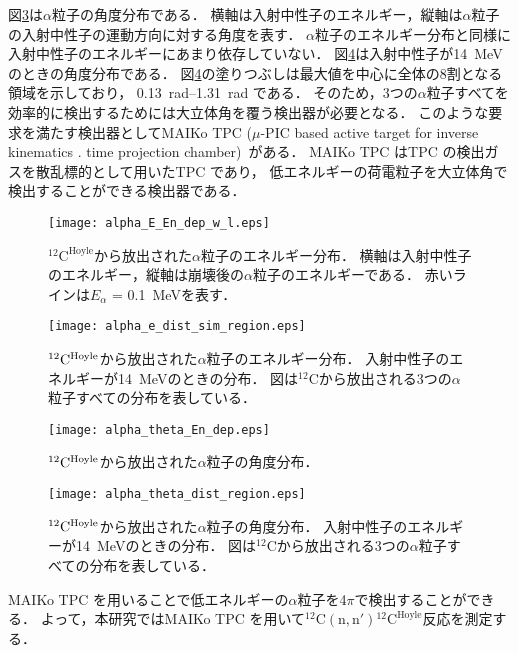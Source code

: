 \documentclass[../master]{subfiles}
\begin{document}
図\ref{fig::alpha_theta_En_dep}は$\alpha$粒子の角度分布である．
横軸は入射中性子のエネルギー，縦軸は$\alpha$粒子の入射中性子の運動方向に対する角度を表す．
$\alpha$粒子のエネルギー分布と同様に入射中性子のエネルギーにあまり依存していない．
図\ref{fig::alpha_theta_dist}は入射中性子が\SI{14}{\mega\electronvolt}のときの角度分布である．
図\ref{fig::alpha_theta_dist}の塗りつぶしは最大値を中心に全体の8割となる領域を示しており，
\SIrange{0.13}{1.31}{\radian} である．
そのため，3つの$\alpha$粒子すべてを効率的に検出するためには大立体角を覆う検出器が必要となる．
このような要求を満たす検出器としてMAIKo TPC ($\mu$-PIC based active target for inverse kinematics .
time projection chamber)~\cite{maiko, mupic}がある．
MAIKo TPC はTPC の検出ガスを散乱標的として用いたTPC であり，
低エネルギーの荷電粒子を大立体角で検出することができる検出器である．
\begin{figure}
  \centering
  \texttt{[image: alpha\_E\_En\_dep\_w\_l.eps]}
  \caption{${}^{12}\mathrm{C}^{\text{Hoyle}}$から放出された$\alpha$粒子のエネルギー分布．
    横軸は入射中性子のエネルギー，縦軸は崩壊後の$\alpha$粒子のエネルギーである．
    赤いラインは$E_{\alpha}$ = \SI{0.1}{\mega\electronvolt}を表す．
  }
  \label{fig::alpha_E_En_dep_w_l}
\end{figure}%
\begin{figure}
  \centering
  \texttt{[image: alpha\_e\_dist\_sim\_region.eps]}
  \caption[${}^{12}{\rm C}^{\text{Hoyle}}$から放出された$\alpha$粒子のエネルギー分布．]
          {${}^{12}{\rm C}^{\text{Hoyle}}$から放出された$\alpha$粒子のエネルギー分布．
            入射中性子のエネルギーが\SI{14}{\mega\electronvolt}のときの分布．
            図は${}^{12}\mathrm{C}$から放出される3つの$\alpha$粒子すべての分布を表している．}
          \label{fig::alpha_E_dist}
\end{figure}%
\begin{figure}
  \centering
  \texttt{[image: alpha\_theta\_En\_dep.eps]}
  \caption{${}^{12}{\rm C}^{\text{Hoyle}}$から放出された$\alpha$粒子の角度分布．}
  \label{fig::alpha_theta_En_dep}
\end{figure}%
\begin{figure}
  \centering
  \texttt{[image: alpha\_theta\_dist\_region.eps]}
  \caption[${}^{12}{\rm C}^{\text{Hoyle}}$から放出された$\alpha$粒子の角度分布．]
          {${}^{12}{\rm C}^{\text{Hoyle}}$から放出された$\alpha$粒子の角度分布．
            入射中性子のエネルギーが\SI{14}{\mega\electronvolt}のときの分布．
            図は${}^{12}\mathrm{C}$から放出される3つの$\alpha$粒子すべての分布を表している．
          }
  \label{fig::alpha_theta_dist}
\end{figure}%
MAIKo TPC を用いることで低エネルギーの$\alpha$粒子を4$\pi$で検出することができる．
よって，本研究ではMAIKo TPC を用いて${}^{12}\mathrm{C}(\mathrm{n},\mathrm{n}'){}^{12}\mathrm{C}^{\text{Hoyle}}$反応を測定する．
\end{document}
